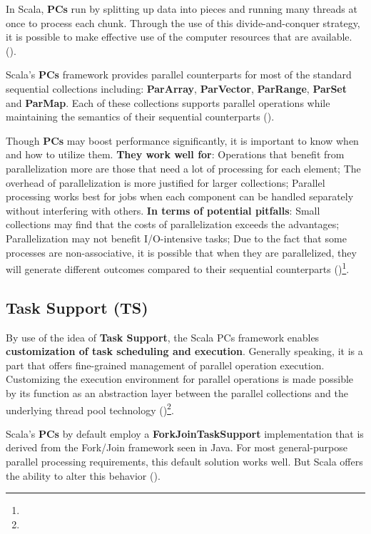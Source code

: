 In Scala, \textbf{PCs} run by splitting up data into pieces and running many threads at once to process each chunk. Through the use of this divide-and-conquer strategy, it is possible to make effective use of the computer resources that are available. (\cite{parallel})\footnotemark[30].



Scala's \textbf{PCs} framework provides parallel counterparts for most of the standard sequential collections including: \textbf{ParArray}, \textbf{ParVector}, \textbf{ParRange}, \textbf{ParSet} and \textbf{ParMap}. Each of these collections supports parallel operations while maintaining the semantics of their sequential counterparts (\cite{parallel})\footnotemark[30].

Though \textbf{PCs} may boost performance significantly, it is important to know when and how to utilize them. \textbf{They work well for}: Operations that benefit from parallelization more are those that need a lot of processing for each element; The overhead of parallelization is more justified for larger collections; Parallel processing works best for jobs when each component can be handled separately without interfering with others. \textbf{In terms of potential pitfalls}: Small collections may find that the costs of parallelization exceeds the advantages; Parallelization may not benefit I/O-intensive tasks; Due to the fact that some processes are non-associative, it is possible that when they are parallelized, they will generate different outcomes compared to their sequential counterparts (\cite{parallel})\footnote[30]{}.



\subsection{Task Support (TS)}
By use of the idea of \textbf{Task Support}, the Scala PCs framework enables \textbf{customization of task scheduling and execution}. Generally speaking, it is a part that offers fine-grained management of parallel operation execution. Customizing the execution environment for parallel operations is made possible by its function as an abstraction layer between the parallel collections and the underlying thread pool technology (\cite{task})\footnote[31]{}.

Scala's \textbf{PCs} by default employ a \textbf{ForkJoinTaskSupport} implementation that is derived from the Fork/Join framework seen in Java. For most general-purpose parallel processing requirements, this default solution works well. But Scala offers the ability to alter this behavior (\cite{task})\footnotemark[31].

